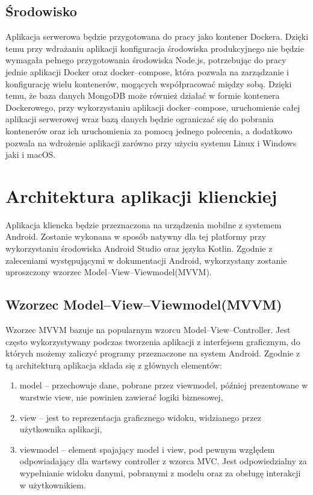 \documentclass[a4paper,12pt,twoside,openany]{report}
\begin{document}
\subsection{Środowisko}
Aplikacja serwerowa będzie przygotowana do pracy jako kontener Dockera. Dzięki temu przy wdrażaniu aplikacji konfiguracja środowiska produkcyjnego nie będzie wymagała pełnego przygotowania środowiska Node.js, potrzebując do pracy jednie aplikacji Docker oraz docker--compose, która pozwala na zarządzanie i konfigurację wielu kontenerów, mogących współpracować między sobą. Dzięki temu, że baza danych MongoDB może również działać w formie kontenera Dockerowego, przy wykorzystaniu aplikacji docker--compose, uruchomienie całej aplikacji serwerowej wraz bazą danych będzie ograniczać się do pobrania kontenerów oraz ich uruchomienia za pomocą jednego polecenia, a dodatkowo pozwala na wdrożenie aplikacji zarówno przy użyciu systemu Linux i Windows jaki i macOS.

\section{Architektura aplikacji klienckiej}
Aplikacja kliencka będzie przeznaczona na urządzenia mobilne z systemem Android. Zostanie wykonana w sposób natywny dla tej platformy przy wykorzystaniu środowiska Android Studio oraz języka Kotlin. Zgodnie z zaleceniami występującymi w dokumentacji Android, wykorzystany zostanie uproszczony wzorzec Model–View–Viewmodel(MVVM). 

\subsection{Wzorzec Model–View–Viewmodel(MVVM)}
Wzorzec MVVM bazuje na popularnym wzorcu Model--View--Controller. Jest często wykorzystywany podczas tworzenia aplikacji z interfejsem graficznym, do których możemy zaliczyć programy przeznaczone na system Android. 
Zgodnie z tą architekturą aplikacja składa się z głównych elementów:
\begin{enumerate}
	\item model -- przechowuje dane, pobrane przez viewmodel, później prezentowane w warstwie view, nie powinien zawierać logiki biznesowej,
	\item view -- jest to reprezentacja graficznego widoku, widzianego przez użytkownika aplikacji,
	\item viewmodel -- element spajający model i view, pod pewnym względem odpowiadający dla wartswy controller z wzorca MVC. Jest odpowiedzialny za wypełnianie widoku danymi, pobranymi z modelu oraz za obsługę interakcji w użytkownikiem. 
\end{enumerate}
\end{document}
